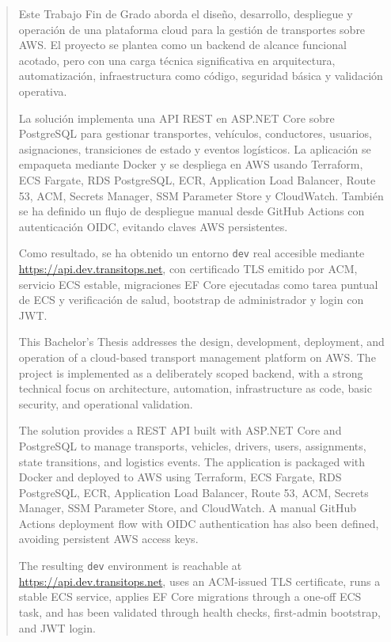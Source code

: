 
\pagestyle{empty}
\begin{abstract}
  Este Trabajo Fin de Grado aborda el diseño, desarrollo, despliegue y operación de una plataforma cloud para la gestión de transportes sobre AWS. El proyecto se plantea como un backend de alcance funcional acotado, pero con una carga técnica significativa en arquitectura, automatización, infraestructura como código, seguridad básica y validación operativa.

  La solución implementa una API REST en ASP.NET Core sobre PostgreSQL para gestionar transportes, vehículos, conductores, usuarios, asignaciones, transiciones de estado y eventos logísticos. La aplicación se empaqueta mediante Docker y se despliega en AWS usando Terraform, ECS Fargate, RDS PostgreSQL, ECR, Application Load Balancer, Route 53, ACM, Secrets Manager, SSM Parameter Store y CloudWatch. También se ha definido un flujo de despliegue manual desde GitHub Actions con autenticación OIDC, evitando claves AWS persistentes.

  Como resultado, se ha obtenido un entorno \texttt{dev} real accesible mediante \url{https://api.dev.transitops.net}, con certificado TLS emitido por ACM, servicio ECS estable, migraciones EF Core ejecutadas como tarea puntual de ECS y verificación de salud, bootstrap de administrador y login con JWT.

  \vspace*{25pt}
  \begin{segundoresumo}
    This Bachelor's Thesis addresses the design, development, deployment, and operation of a cloud-based transport management platform on AWS. The project is implemented as a deliberately scoped backend, with a strong technical focus on architecture, automation, infrastructure as code, basic security, and operational validation.

    The solution provides a REST API built with ASP.NET Core and PostgreSQL to manage transports, vehicles, drivers, users, assignments, state transitions, and logistics events. The application is packaged with Docker and deployed to AWS using Terraform, ECS Fargate, RDS PostgreSQL, ECR, Application Load Balancer, Route 53, ACM, Secrets Manager, SSM Parameter Store, and CloudWatch. A manual GitHub Actions deployment flow with OIDC authentication has also been defined, avoiding persistent AWS access keys.

    The resulting \texttt{dev} environment is reachable at \url{https://api.dev.transitops.net}, uses an ACM-issued TLS certificate, runs a stable ECS service, applies EF Core migrations through a one-off ECS task, and has been validated through health checks, first-admin bootstrap, and JWT login.
  \end{segundoresumo}
\vspace*{25pt}

\end{abstract}
\pagestyle{fancy}

